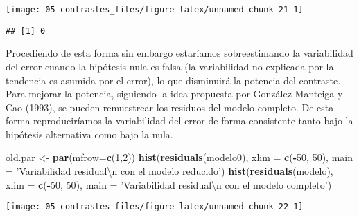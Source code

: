 \documentclass[
]{book}
\newenvironment{Shaded}{\begin{snugshade}}{\end{snugshade}}
\newcommand{\CharTok}[1]{\textcolor[rgb]{0.31,0.60,0.02}{#1}}
\newcommand{\CommentTok}[1]{\textcolor[rgb]{0.56,0.35,0.01}{\textit{#1}}}
\newcommand{\DataTypeTok}[1]{\textcolor[rgb]{0.13,0.29,0.53}{#1}}
\newcommand{\DecValTok}[1]{\textcolor[rgb]{0.00,0.00,0.81}{#1}}
\newcommand{\KeywordTok}[1]{\textcolor[rgb]{0.13,0.29,0.53}{\textbf{#1}}}
\newcommand{\NormalTok}[1]{#1}
\newcommand{\OperatorTok}[1]{\textcolor[rgb]{0.81,0.36,0.00}{\textbf{#1}}}
\newcommand{\StringTok}[1]{\textcolor[rgb]{0.31,0.60,0.02}{#1}}
\theoremstyle{break}
\theoremstyle{definition}
\theoremstyle{definition}
\theoremstyle{definition}
\theoremstyle{remark}
\begin{document}
\begin{center}\texttt{[image: 05-contrastes\_files/figure-latex/unnamed-chunk-21-1]} \end{center}

\begin{Shaded}
\end{Shaded}

\begin{verbatim}
## [1] 0
\end{verbatim}

Procediendo de esta forma sin embargo estaríamos sobreestimando la variabilidad
del error cuando la hipótesis nula es falsa (la variabilidad no explicada por la
tendencia es asumida por el error), lo que disminuirá la potencia del contraste.
Para mejorar la potencia, siguiendo la idea propuesta por González-Manteiga
y Cao (1993), se pueden remuestrear los residuos del modelo completo.
De esta forma reproduciríamos la variabilidad del error de forma consistente
tanto bajo la hipótesis alternativa como bajo la nula.

\begin{Shaded}
\begin{Highlighting}[]
\NormalTok{old.par <-}\StringTok{ }\KeywordTok{par}\NormalTok{(}\DataTypeTok{mfrow=}\KeywordTok{c}\NormalTok{(}\DecValTok{1}\NormalTok{,}\DecValTok{2}\NormalTok{))}
\KeywordTok{hist}\NormalTok{(}\KeywordTok{residuals}\NormalTok{(modelo0), }\DataTypeTok{xlim =} \KeywordTok{c}\NormalTok{(}\OperatorTok{-}\DecValTok{50}\NormalTok{, }\DecValTok{50}\NormalTok{), }
     \DataTypeTok{main =} \StringTok{'Variabilidad residual}\CharTok{\textbackslash{}n}\StringTok{ con el modelo reducido'}\NormalTok{)}
\KeywordTok{hist}\NormalTok{(}\KeywordTok{residuals}\NormalTok{(modelo), }\DataTypeTok{xlim =} \KeywordTok{c}\NormalTok{(}\OperatorTok{-}\DecValTok{50}\NormalTok{, }\DecValTok{50}\NormalTok{), }
     \DataTypeTok{main =} \StringTok{'Variabilidad residual}\CharTok{\textbackslash{}n}\StringTok{ con el modelo completo'}\NormalTok{)}
\end{Highlighting}
\end{Shaded}

\begin{center}\texttt{[image: 05-contrastes\_files/figure-latex/unnamed-chunk-22-1]} \end{center}
\end{document}
